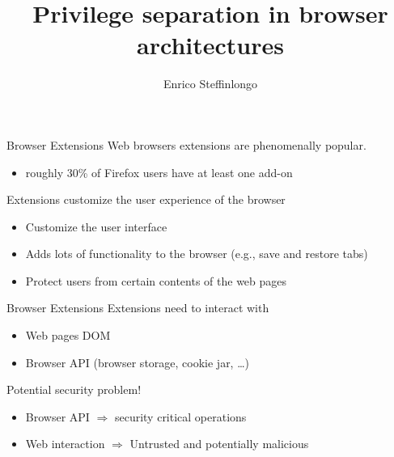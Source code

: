 \documentclass[11pt]{beamer}
\author{Enrico Steffinlongo}
\title{Privilege separation in browser architectures}
\institute[Universities Here and There] %
{
  Università Ca' Foscari - Computer science
}
\begin{document}
\begin{frame}
\titlepage
\end{frame}



\begin{frame}{Browser Extensions}
Web browsers extensions are phenomenally popular.
\begin{itemize}
\item roughly 30\% of Firefox users have at least one add-on
\end{itemize}
Extensions customize the user experience of the browser
\begin{itemize}
\item Customize the user interface
\item Adds lots of functionality to the browser (e.g., save and restore tabs)
\item Protect users from certain contents of the web pages 
\end{itemize}
\end{frame}

\begin{frame}{Browser Extensions}
Extensions need to interact with
\begin{itemize}
\item Web pages DOM
\item Browser API (browser storage, cookie jar, \dots)
\end{itemize}
Potential security problem!
\begin{itemize}
\item Browser API $\Rightarrow$ security critical operations\\
\item Web interaction $\Rightarrow$ Untrusted and potentially malicious\\
\end{itemize}
\end{frame}
\end{document}
